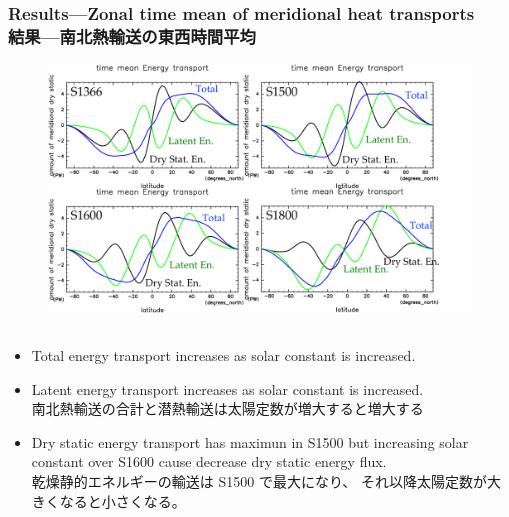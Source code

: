 \documentclass[aspectratio=149,9pt,fleqn,tbtags]{beamer}
\newcommand{\jp}[1]{{\footnotesize #1}}
\begin{document}
\begin{frame}
	\frametitle{Results---Zonal time mean of meridional heat transports\\結果---南北熱輸送の東西時間平均}
	\begin{figure}
		\centering\scriptsize
		\includegraphics[width=.5\textwidth]{fig-enflx.pdf}
	\end{figure}
	\begin{columns}[T]
		\begin{column}{\textwidth}
			\begin{itemize}
				\item Total energy transport increases as solar constant is increased.
				\item Latent energy transport increases as solar constant is increased.\\
					\jp{南北熱輸送の合計と潜熱輸送は太陽定数が増大すると増大する}
				\item Dry static energy transport has maximun in S1500
					but increasing solar constant over S1600 cause decrease dry static energy flux.\\
					\jp{乾燥静的エネルギーの輸送は S1500 で最大になり、
					それ以降太陽定数が大きくなると小さくなる。}
			\end{itemize}
		\end{column}
	\end{columns}
\end{frame}
\end{document}
